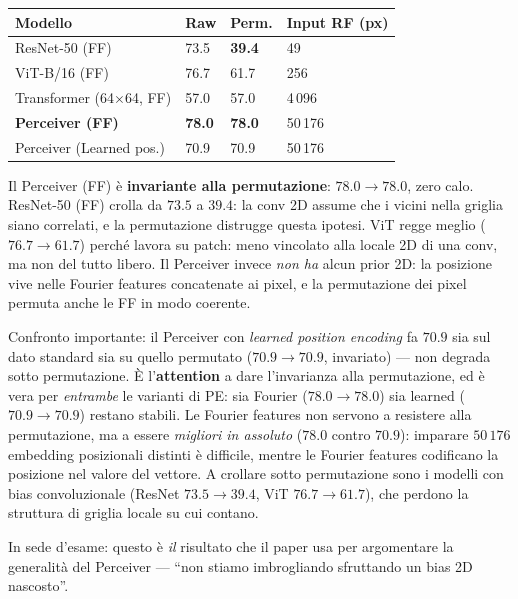 \documentclass[
  11pt,
]{article}
\begin{document}
{\small
\begin{longtable}{@{}p{5cm} p{1.8cm} p{1.8cm} p{3cm}@{}}
\toprule
\textbf{Modello} & \textbf{Raw} & \textbf{Perm.} & \textbf{Input RF (px)} \\
\midrule
\endhead
ResNet-50 (FF) & 73.5 & \textbf{39.4} & 49 \\[2pt]
ViT-B/16 (FF) & 76.7 & 61.7 & 256 \\[2pt]
Transformer (64$\times$64, FF) & 57.0 & 57.0 & 4\,096 \\[2pt]
\textbf{Perceiver (FF)} & \textbf{78.0} & \textbf{78.0} & 50\,176 \\[2pt]
Perceiver (Learned pos.) & 70.9 & 70.9 & 50\,176 \\
\bottomrule
\end{longtable}
}

\begin{notabox}[title={\textbf{Argomento chiave del paper: permutation invariance}}]
Il Perceiver (FF) è \textbf{invariante alla permutazione}: $78.0 \to 78.0$, zero calo. ResNet-50 (FF) crolla da $73.5$ a $39.4$: la conv 2D assume che i vicini nella griglia siano correlati, e la permutazione distrugge questa ipotesi. ViT regge meglio ($76.7 \to 61.7$) perché lavora su patch: meno vincolato alla locale 2D di una conv, ma non del tutto libero. Il Perceiver invece \emph{non ha} alcun prior 2D: la posizione vive nelle Fourier features concatenate ai pixel, e la permutazione dei pixel permuta anche le FF in modo coerente.

Confronto importante: il Perceiver con \emph{learned position encoding} fa $70.9$ sia sul dato standard sia su quello permutato (\textbf{$70.9 \to 70.9$}, invariato) --- non degrada sotto permutazione. È l'\textbf{attention} a dare l'invarianza alla permutazione, ed è vera per \emph{entrambe} le varianti di PE: sia Fourier ($78.0 \to 78.0$) sia learned ($70.9 \to 70.9$) restano stabili. Le Fourier features non servono a resistere alla permutazione, ma a essere \emph{migliori in assoluto} ($78.0$ contro $70.9$): imparare $50\,176$ embedding posizionali distinti è difficile, mentre le Fourier features codificano la posizione nel valore del vettore. A crollare sotto permutazione sono i modelli con bias convoluzionale (ResNet $73.5 \to 39.4$, ViT $76.7 \to 61.7$), che perdono la struttura di griglia locale su cui contano.

In sede d'esame: questo è \emph{il} risultato che il paper usa per argomentare la generalità del Perceiver --- ``non stiamo imbrogliando sfruttando un bias 2D nascosto''.
\end{notabox}
\end{document}
